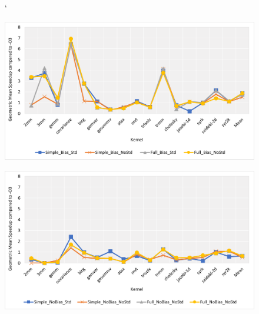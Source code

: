 \documentclass[logo,msc]{infthesis}           %
\begin{document}
\begin{figure}`
\centering
\begin{minipage}{.45\linewidth}
  \includegraphics[width=\linewidth]{Images/Bias_Chart.png}
  \label{fig:Bias_Chart}
\end{minipage}
\hspace{.05\linewidth}
\begin{minipage}{.45\linewidth}
  \includegraphics[width=\linewidth]{Images/NoBias_Chart.png}
  \label{fig:NoBias_Chart}
\end{minipage}
\end{figure}
\end{document}
